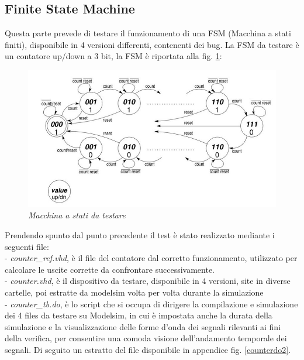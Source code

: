 \subsection{Finite State Machine}
Questa parte prevede di testare il  funzionamento di una FSM (Macchina a stati finiti), disponibile in 4 versioni differenti, contenenti dei bug.  
La FSM da testare è un contatore up/down a 3 bit, la FSM è riportata alla fig. \ref{fsm_lab6}:
\begin{figure}[!htb]
	\centering
	\includegraphics[scale=0.8]{immagini/fsm_lab6}
	\caption{\textit{Macchina a stati da testare}}
	\label{fsm_lab6}
\end{figure}
\newpage
Prendendo spunto dal punto precedente il test è stato realizzato mediante i seguenti file:\\
- \textit{counter\_ref.vhd}, è il file del contatore dal corretto funzionamento, utilizzato per calcolare le uscite corrette da confrontare successivamente.
\\
- \textit{counter.vhd}, è il dispositivo da testare, disponibile in 4 versioni, site in diverse cartelle, poi estratte da modelsim volta per volta durante la simulazione
\\
- \textit{counter\_tb.do}, è lo script che si occupa di dirigere la compilazione e simulazione dei 4 files da testare su Modelsim, in cui è impostata anche la durata della simulazione e la visualizzazione delle forme d’onda dei segnali rilevanti ai fini della verifica, per consentire una comoda visione dell’andamento temporale dei segnali.
Di seguito un estratto del file disponibile in appendice fig. \ref{counterdo2}.\\
\\
